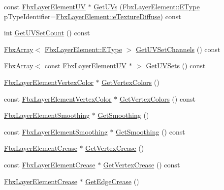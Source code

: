 \begin{DoxyCompactItemize}
\item 
const \hyperlink{class_fbx_layer_element_u_v}{Fbx\+Layer\+Element\+UV} $\ast$ \hyperlink{class_fbx_layer_a734b034b1118084b8420b1a591d64fca}{Get\+U\+Vs} (\hyperlink{class_fbx_layer_element_a8c95c5cd880b56c776acd379bd86f42c}{Fbx\+Layer\+Element\+::\+E\+Type} p\+Type\+Identifier=\hyperlink{class_fbx_layer_element_a8c95c5cd880b56c776acd379bd86f42ca09829e6ecf512e7ae04d9ad8de1342fa}{Fbx\+Layer\+Element\+::e\+Texture\+Diffuse}) const
\item 
int \hyperlink{class_fbx_layer_a4c3477c65c49df6843f9120496026174}{Get\+U\+V\+Set\+Count} () const
\item 
\hyperlink{class_fbx_array}{Fbx\+Array}$<$ \hyperlink{class_fbx_layer_element_a8c95c5cd880b56c776acd379bd86f42c}{Fbx\+Layer\+Element\+::\+E\+Type} $>$ \hyperlink{class_fbx_layer_a4aad80bcc55ac82243966ac9ec62856f}{Get\+U\+V\+Set\+Channels} () const
\item 
\hyperlink{class_fbx_array}{Fbx\+Array}$<$ const \hyperlink{class_fbx_layer_element_u_v}{Fbx\+Layer\+Element\+UV} $\ast$ $>$ \hyperlink{class_fbx_layer_a833ec1951767dc72e73d451e3777ba5a}{Get\+U\+V\+Sets} () const
\item 
\hyperlink{class_fbx_layer_element_vertex_color}{Fbx\+Layer\+Element\+Vertex\+Color} $\ast$ \hyperlink{class_fbx_layer_a050877e12380125dda894a6136f04564}{Get\+Vertex\+Colors} ()
\item 
const \hyperlink{class_fbx_layer_element_vertex_color}{Fbx\+Layer\+Element\+Vertex\+Color} $\ast$ \hyperlink{class_fbx_layer_ae13147ff5eb67684081f507e1654f46d}{Get\+Vertex\+Colors} () const
\item 
\hyperlink{class_fbx_layer_element_smoothing}{Fbx\+Layer\+Element\+Smoothing} $\ast$ \hyperlink{class_fbx_layer_ada25c7852f5f38e9a053b29858f450c8}{Get\+Smoothing} ()
\item 
const \hyperlink{class_fbx_layer_element_smoothing}{Fbx\+Layer\+Element\+Smoothing} $\ast$ \hyperlink{class_fbx_layer_a82ea6910c739e0e56b31dd71a053dc44}{Get\+Smoothing} () const
\item 
\hyperlink{class_fbx_layer_element_crease}{Fbx\+Layer\+Element\+Crease} $\ast$ \hyperlink{class_fbx_layer_a6de0fbabb2845d0e90a0755c8e3382aa}{Get\+Vertex\+Crease} ()
\item 
const \hyperlink{class_fbx_layer_element_crease}{Fbx\+Layer\+Element\+Crease} $\ast$ \hyperlink{class_fbx_layer_a452a6eae29e57f1fadfa6ca218dc3e03}{Get\+Vertex\+Crease} () const
\item 
\hyperlink{class_fbx_layer_element_crease}{Fbx\+Layer\+Element\+Crease} $\ast$ \hyperlink{class_fbx_layer_ae2e4f8ccb8cb6ddc101bf01986b1661b}{Get\+Edge\+Crease} ()

\end{DoxyCompactItemize}
